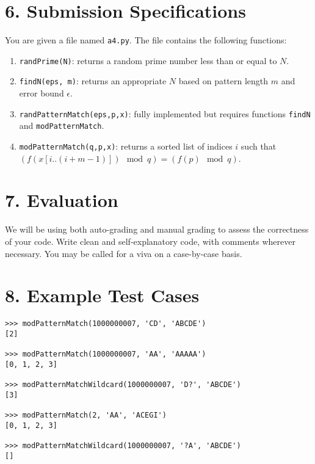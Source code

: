 \documentclass{article}
\begin{document}
\section*{6. Submission Specifications}
You are given a file named \texttt{a4.py}. The file contains the following functions:
\begin{enumerate}
    \item \texttt{randPrime(N)}: returns a random prime number less than or equal to $N$.
    \item \texttt{findN(eps, m)}: returns an appropriate $N$ based on pattern length $m$ and error bound $\epsilon$.
    \item \texttt{randPatternMatch(eps,p,x)}: fully implemented but requires functions \texttt{findN} and \texttt{modPatternMatch}.
    \item \texttt{modPatternMatch(q,p,x)}: returns a sorted list of indices $i$ such that $(f(x[i..(i+m-1)]) \mod q) = (f(p) \mod q)$.
\end{enumerate}

\section*{7. Evaluation}
We will be using both auto-grading and manual grading to assess the correctness of your code. Write clean and self-explanatory code, with comments wherever necessary. You may be called for a viva on a case-by-case basis.

\section*{8. Example Test Cases}
\begin{verbatim}
>>> modPatternMatch(1000000007, 'CD', 'ABCDE')
[2]

>>> modPatternMatch(1000000007, 'AA', 'AAAAA')
[0, 1, 2, 3]

>>> modPatternMatchWildcard(1000000007, 'D?', 'ABCDE')
[3]

>>> modPatternMatch(2, 'AA', 'ACEGI')
[0, 1, 2, 3]

>>> modPatternMatchWildcard(1000000007, '?A', 'ABCDE')
[]
\end{verbatim}



\thispagestyle{plain}
\end{document}
